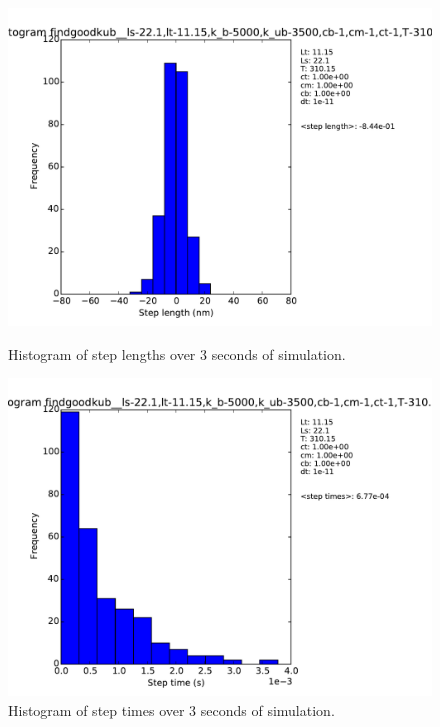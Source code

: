 \documentclass[10pt]{article} %
\begin{document}
\begin{figure}[h!]
  \centering
  \begin{minipage}[b]{0.49\textwidth}
    \includegraphics[width=\textwidth]{../figures/length_histogram_sample}
    \caption{Histogram of step lengths over 3 seconds of simulation.}
  \end{minipage}
  \begin{minipage}[b]{0.49\textwidth}
    \includegraphics[width=\textwidth]{../figures/time_histogram_sample}
    \caption{Histogram of step times over 3 seconds of simulation.}
  \end{minipage}
\end{figure}
\end{document}

